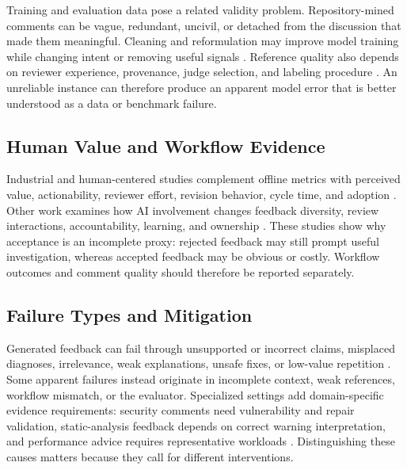 \documentclass[10pt]{article}
\begin{document}
Training and evaluation data pose a related validity problem. Repository-mined comments can be vague, redundant, uncivil, or detached from the discussion that made them meaningful. Cleaning and reformulation may improve model training while changing intent or removing useful signals \cite{p08_liu2025_too_noisy,p18_bensghaier2025_curated_reviews}. Reference quality also depends on reviewer experience, provenance, judge selection, and labeling procedure \cite{p23_lin2026_reviewer_experience,p30_weyssow2025_codeultrafeedback,p42_wasserbaech2024_chatgpt_github}. An unreliable instance can therefore produce an apparent model error that is better understood as a data or benchmark failure.

\subsection{Human Value and Workflow Evidence}

Industrial and human-centered studies complement offline metrics with perceived value, actionability, reviewer effort, revision behavior, cycle time, and adoption \cite{p03_tantithamthavorn2026_rovodev,p07_olewicki2024_revmate,p10_sun2025_bitsai_cr}. Other work examines how AI involvement changes feedback diversity, review interactions, accountability, learning, and ownership \cite{p26_zhong2026_human_ai_synergy,p27_chowdhury2026_industry_claims,p28_heander2025_support_not_automation}. These studies show why acceptance is an incomplete proxy: rejected feedback may still prompt useful investigation, whereas accepted feedback may be obvious or costly. Workflow outcomes and comment quality should therefore be reported separately.

\subsection{Failure Types and Mitigation}

Generated feedback can fail through unsupported or incorrect claims, misplaced diagnoses, irrelevance, weak explanations, unsafe fixes, or low-value repetition \cite{p01_lu2025_deepcrceval,p02_tantithamthavorn2026_hallujudge,p19_nguyen2025_fine_grained_classification,p25_yu2024_finetuning_acr,p41_widyasari2025_explaining_explanations}. Some apparent failures instead originate in incomplete context, weak references, workflow mismatch, or the evaluator. Specialized settings add domain-specific evidence requirements: security comments need vulnerability and repair validation, static-analysis feedback depends on correct warning interpretation, and performance advice requires representative workloads \cite{p21_peng2025_icodereviewer,p22_jaoua2025_static_analyzers,p46_zhou2025_vulnerability_repair,p48_patcas2026_code_quality_issues,p50_peng2025_coffe}. Distinguishing these causes matters because they call for different interventions.
\end{document}

